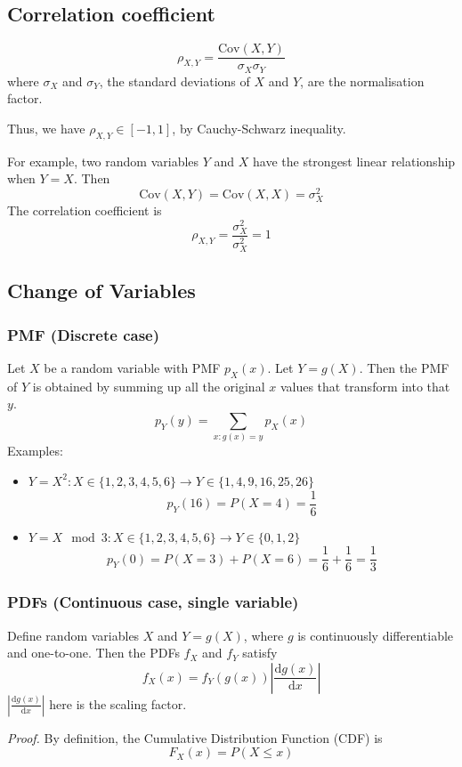 \documentclass[../Probability.tex]{subfiles}
\begin{document}
\subsection{Correlation coefficient}
\[\rho_{X,Y} = \frac{\text{Cov}(X, Y)}{\sigma_X \sigma_Y}\]
where $\sigma_X$ and $\sigma_Y$, the standard deviations of $X$ and $Y$, are the normalisation factor.

\medskip
\noindent Thus, we have $\rho_{X,Y}\in[-1,1]$, by Cauchy-Schwarz inequality.

\noindent For example, two random variables $Y$ and $X$ have the strongest
linear relationship when $Y=X$. Then 
\[\text{Cov}(X,Y)=\text{Cov}(X,X)=\sigma_X^2\]
The correlation coefficient is
\[\rho_{X,Y}=\frac{\sigma_X^2}{\sigma_X^2}=1\]

\subsection{Change of Variables}
\subsubsection{PMF (Discrete case)}
Let $X$ be a random variable with PMF $p_X(x)$.\newline
Let $Y=g(X)$.\newline
Then the PMF of $Y$ is obtained by summing up all the original $x$ values that transform into that $y$.
\[p_Y(y)=\sum_{x:g(x)=y}p_X(x)\]
\noindent Examples:
\begin{itemize}
    \item $Y=X^2:X\in\{1,2,3,4,5,6\}\rightarrow Y\in \{1,4,9,16,25,26\}$
    \[
    p_Y(16)=P(X=4)=\frac{1}{6}
    \]
    \item $Y=X\mod 3: X\in\{1,2,3,4,5,6\}\rightarrow Y\in\{0,1,2\}$
    \[p_Y(0)=P(X=3) + P(X=6) = \frac{1}{6} + \frac{1}{6} = \frac{1}{3}\]
\end{itemize}

\subsubsection{PDFs (Continuous case, single variable)}
Define random variables $X$ and $Y=g(X)$, where $g$ is continuously differentiable and one-to-one. \newline
Then the PDFs $f_X$ and $f_Y$ satisfy
\[f_X(x)=f_Y(g(x))\left|\frac{\mathrm{d}g(x)}{\mathrm{d}x}\right|\]
$\left|\frac{\mathrm{d}g(x)}{\mathrm{d}x}\right|$ here is the scaling factor.

\medskip
\noindent\textit{Proof.}
By definition, the Cumulative Distribution Function (CDF) is
\[
    F_X(x) = P(X \leq x)
\]
\end{document}
